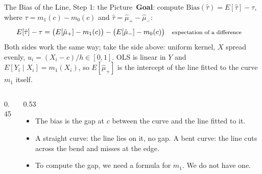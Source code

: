 \documentclass[aspectratio=169,11pt,xcolor=dvipsnames]{beamer}
\newcommand{\E}{E}
\newcommand{\core}{\,\raisebox{0.6pt}{\textcolor{corestar}{$\bigstar$}}}
\begin{document}
\begin{frame}{The Bias of the Line, Step 1: the Picture\core}
\textbf{Goal}: compute $\text{Bias}(\hat\tau) = \E[\hat\tau] - \tau$, where
$\tau = m_1(c) - m_0(c)$ and $\hat\tau = \hat\mu_+ - \hat\mu_-$:
\begin{align*}
  \E[\hat\tau] - \tau
  &= \big(\E[\hat\mu_+] - m_1(c)\big) - \big(\E[\hat\mu_-] - m_0(c)\big)
   && \text{\footnotesize expectation of a difference}
\end{align*}
\vskip-4pt
Both sides work the same way; \alert{take the side above}: uniform kernel, $X$
spread evenly, $u_i = (X_i - c)/h \in [0,1]$. OLS is linear in $Y$ and
$\E[Y_i\mid X_i] = m_1(X_i)$, so $\E[\hat\mu_+]$ is the intercept of the line
fitted to the curve $m_1$ itself.
\begin{columns}[T]
\begin{column}{0.45\textwidth}
\begin{center}
\end{center}
\end{column}
\begin{column}{0.53\textwidth}
\begin{itemize}\itemsep3pt
  \item The bias is the \alert{gap at $c$} between the curve and the line fitted
        to it.
  \item A straight curve: the line lies on it, no gap. A bent curve: the line
        cuts across the bend and misses at the edge.
  \item To compute the gap, we need a formula for $m_1$. We do not have one.
\end{itemize}
\end{column}
\end{columns}
\end{frame}
\end{document}
